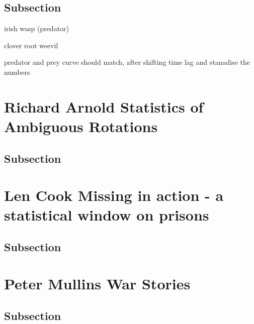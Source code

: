 \documentclass[
]{book}
\begin{document}
\hypertarget{subsection}{%
\section{Subsection}\label{subsection}}

irish wasp (predator)

clover root weevil

predator and prey curve should match, after shifting time lag and stanadise the numbers

\hypertarget{richard-arnold-statistics-of-ambiguous-rotations}{%
\chapter*{Richard Arnold \textbar{} Statistics of Ambiguous Rotations}\label{richard-arnold-statistics-of-ambiguous-rotations}}

\hypertarget{subsection}{%
\section{Subsection}\label{subsection}}

\hypertarget{len-cook-missing-in-action---a-statistical-window-on-prisons}{%
\chapter*{Len Cook \textbar{} Missing in action - a statistical window on prisons}\label{len-cook-missing-in-action---a-statistical-window-on-prisons}}

\hypertarget{subsection}{%
\section{Subsection}\label{subsection}}

\hypertarget{peter-mullins-war-stories}{%
\chapter*{Peter Mullins \textbar{} War Stories}\label{peter-mullins-war-stories}}

\hypertarget{subsection}{%
\section{Subsection}\label{subsection}}
\end{document}

